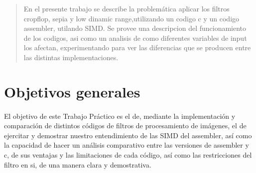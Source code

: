 \documentclass[a4paper]{article}
\begin{document}
\thispagestyle{empty}

\maketitle
\newpage

\thispagestyle{empty}
\vfill
\begin{abstract}
En el presente trabajo se describe la problemática aplicar los filtros cropflop, sepia y low dinamic range,utilizando un codigo c y un codigo assembler, utilando SIMD. Se provee una descripcion del funcionamiento de los codigos, asi como un analisis de como diferentes variables de input los afectan, experimentando para ver las diferencias que se producen entre las distintas implementaciones.
\end{abstract}

\thispagestyle{empty}
\vspace{3cm}
\tableofcontents
\newpage


\newpage

\section{Objetivos generales}
\paragraph{}
El objetivo de este Trabajo Práctico es el de, mediante la implementación y comparación de distintos códigos de filtros de procesamiento de imágenes,  el de   ejercitar y demostrar nuestro entendimiento de las SIMD del assembler, así como la capacidad de hacer un análisis comparativo entre las versiones de assembler y c, de sus ventajas y las limitaciones de cada  código, así como las restricciones del filtro en si, de una manera clara y demostrativa. 
        
\end{document}
